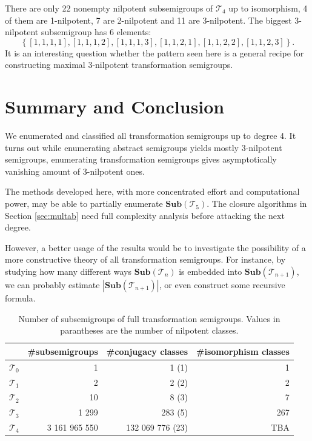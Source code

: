 \documentclass{amsart}
\newcommand{\cT}{{\mathcal T}}
\newcommand{\Sub}{\mathbf{Sub}}
\theoremstyle{plain}
\theoremstyle{definition}
\begin{document}
There are only 22 nonempty nilpotent subsemigroups of $\cT_4$ up to isomorphism, 4 of them are 1-nilpotent, 7 are 2-nilpotent and 11 are 3-nilpotent.
The biggest 3-nilpotent subsemigroup has 6 elements:
$$\left\{[1,1,1,1],[1,1,1,2],[1,1,1,3],[1,1,2,1],[1,1,2,2],[1,1,2,3]\right\}.$$
It is an interesting question whether the pattern seen here is a general recipe for constructing maximal 3-nilpotent transformation semigroups.
\section{Summary and Conclusion}
We enumerated and classified all transformation semigroups up to degree 4.
It turns out while enumerating abstract semigroups yields mostly 3-nilpotent semigroups, enumerating transformation semigroups gives asymptotically vanishing amount of 3-nilpotent ones.

The methods developed here, with more concentrated effort and computational power,  may be able to partially enumerate $\Sub(\cT_5)$.
The closure algorithms in Section \ref{sec:multab} need full complexity analysis before attacking the next degree. 

However, a better usage of the results would be to investigate the possibility of a more constructive theory of all transformation semigroups.
For instance, by studying how many different ways $\Sub(\cT_n)$ is embedded into $\Sub(\cT_{n+1})$, we can probably estimate $|\Sub(\cT_{n+1})|$, or even construct some recursive formula.
\begin{table}
\renewcommand{\arraystretch}{1}
\begin{tabular}{|c|r|r|r|}
\hline
 & \#subsemigroups & \#conjugacy classes & \#isomorphism classes \\
\hline
$\cT_0$ & 1  & 1 (1)& 1\\
\hline
$\cT_1$ & 2  & 2 (2)& 2\\
\hline
$\cT_2$ & 10  & 8 (3)& 7\\
\hline
$\cT_3$ & 1 299 & 283 (5)& 267\\
\hline
$\cT_4$ & 3 161 965 550 & 132 069 776 (23)& TBA\\
\hline
\end{tabular}
\caption{Number of subsemigroups of full transformation semigroups. Values in parantheses are the number of nilpotent classes.}
\end{table}




\end{document}
